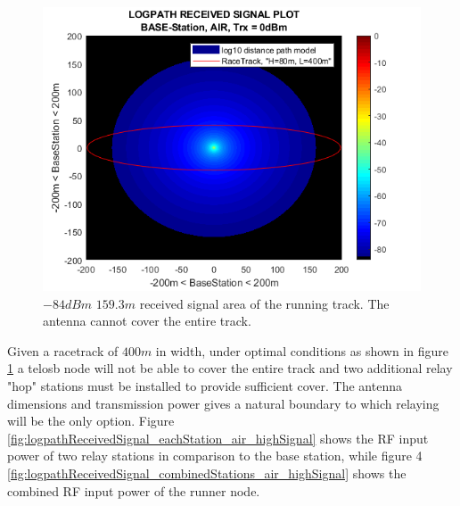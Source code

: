 \begin{figure}[h]
	\centering
	\includegraphics[width=1\linewidth]{theory/pathLoss/fig/logpathReceivedSignal_baseStation_air_highSignal.png}
	\caption{$-84dBm$ $159.3m$ received signal area of the running track. The antenna cannot cover the entire track.}
	\label{fig:logpathReceivedSignal_baseStation_air_highSignal}
\end{figure}

\noindent Given a racetrack of $400m$ in width, under optimal conditions as shown in figure \ref{fig:logpathReceivedSignal_baseStation_air_highSignal} a telosb node will not be able to cover the entire track and two additional relay "hop" stations must be installed to provide sufficient cover. The antenna dimensions and transmission power gives a natural boundary to which relaying will be the only option. Figure \ref{fig:logpathReceivedSignal_eachStation_air_highSignal} shows the RF input power of two relay stations in comparison to the base station, while figure 4 \ref{fig:logpathReceivedSignal_combinedStations_air_highSignal} shows the combined RF input power of the runner node.

